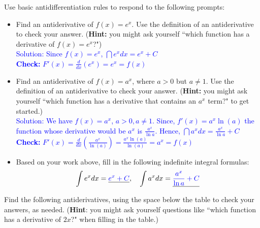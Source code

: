 \documentclass[10pt]{article}
\begin{document}
{} Use basic antidifferentiation rules to respond to the following prompts:
\begin{itemize}
\item[(a)] Find an antiderivative of $f(x)=e^x$. Use the definition of an antiderivative to check your answer. ({\bf Hint:} you might ask yourself ``which function has a derivative of $f(x)=e^x$?")
\\
\textcolor{blue}{Solution:
 Since $f(x)=e^x$, $\dint e^x dx = e^x + C$\\
 \textbf{Check:} $F'(x) = \frac{d}{dx}(e^x) = e^x = f(x)$
 }{}\item[(b)] Find an antiderivative of $f(x)=a^x$, where $a>0$ but $a\not=1$. Use the definition of an antiderivative to check your answer. ({\bf Hint:} you might ask yourself ``which function has a derivative that contains an $a^x$ term?" to get started.)
\\

\textcolor{blue}{Solution: We have $f(x)=a^x$, $a>0, a\neq 1$. Since, $f'(x) = a^x \ln(a)$ the function whose derivative would be $a^x$ is $\frac{a^x}{\ln a}$. Hence, $\dint a^x dx = \frac{a^x}{\ln a} + C$  \\
\textbf{Check:} $F'(x) = \frac{d}{dx}(\frac{a^x}{\ln(a)}) = \frac{a^x \ln(a)}{\ln(a)} = a^x = f(x)$
}
\item[(c)] Based on your work above, fill in the following indefinite integral formulas:\\
\[\displaystyle\int e^x dx = \underline{\textcolor{blue}{e^x + C}}, \quad \displaystyle\int a^x dx = \underline{\textcolor{blue}{\frac{a^x}{\ln a} + C}}\]
\end{itemize}

\newpage

\begin{center}
\end{center}
{} Find the following antiderivatives, using the space below the table to check your answers, as needed. ({\bf Hint}: you might ask yourself questions like ``which function has a derivative of $2x$?" when filling in the table.)
\renewcommand{\arraystretch}{2}
\end{document}
